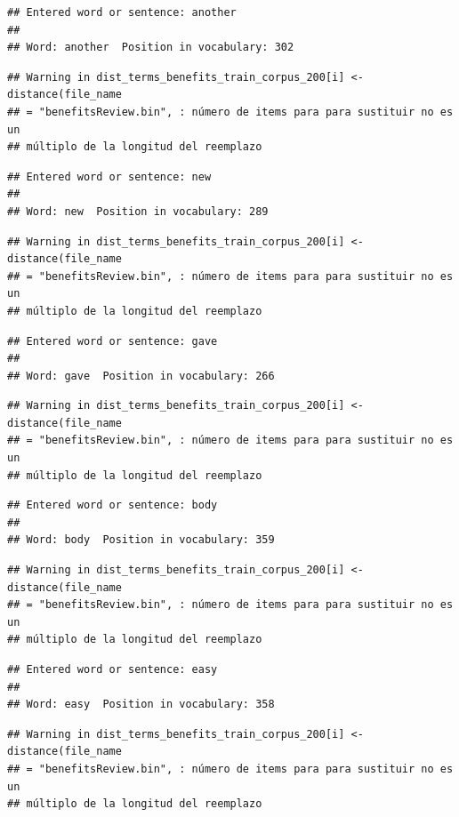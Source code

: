\documentclass[spanish,]{article}
\begin{document}
\begin{verbatim}
## Entered word or sentence: another
## 
## Word: another  Position in vocabulary: 302
\end{verbatim}

\begin{verbatim}
## Warning in dist_terms_benefits_train_corpus_200[i] <- distance(file_name
## = "benefitsReview.bin", : número de items para para sustituir no es un
## múltiplo de la longitud del reemplazo
\end{verbatim}

\begin{verbatim}
## Entered word or sentence: new
## 
## Word: new  Position in vocabulary: 289
\end{verbatim}

\begin{verbatim}
## Warning in dist_terms_benefits_train_corpus_200[i] <- distance(file_name
## = "benefitsReview.bin", : número de items para para sustituir no es un
## múltiplo de la longitud del reemplazo
\end{verbatim}

\begin{verbatim}
## Entered word or sentence: gave
## 
## Word: gave  Position in vocabulary: 266
\end{verbatim}

\begin{verbatim}
## Warning in dist_terms_benefits_train_corpus_200[i] <- distance(file_name
## = "benefitsReview.bin", : número de items para para sustituir no es un
## múltiplo de la longitud del reemplazo
\end{verbatim}

\begin{verbatim}
## Entered word or sentence: body
## 
## Word: body  Position in vocabulary: 359
\end{verbatim}

\begin{verbatim}
## Warning in dist_terms_benefits_train_corpus_200[i] <- distance(file_name
## = "benefitsReview.bin", : número de items para para sustituir no es un
## múltiplo de la longitud del reemplazo
\end{verbatim}

\begin{verbatim}
## Entered word or sentence: easy
## 
## Word: easy  Position in vocabulary: 358
\end{verbatim}

\begin{verbatim}
## Warning in dist_terms_benefits_train_corpus_200[i] <- distance(file_name
## = "benefitsReview.bin", : número de items para para sustituir no es un
## múltiplo de la longitud del reemplazo
\end{verbatim}
\end{document}
